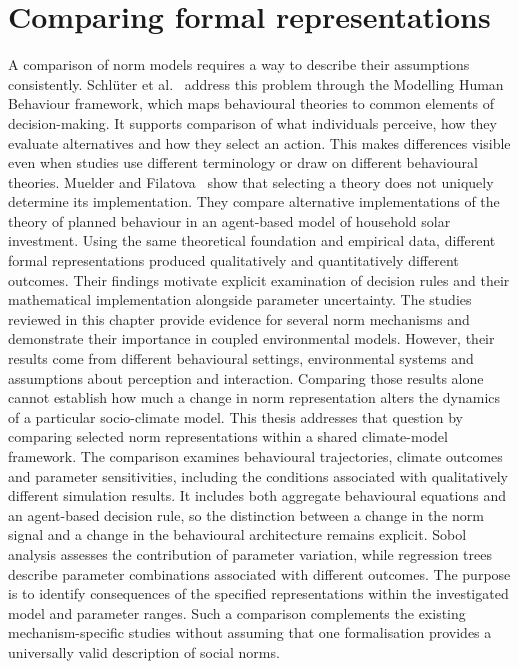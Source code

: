 \section{Comparing formal representations}
\label{sec:related-model-comparison}

A comparison of norm models requires a way to describe their assumptions consistently. Schl\"uter et
al.~\cite{schlueter2017framework} address this problem through the Modelling Human Behaviour framework,
which maps behavioural theories to common elements of decision-making. It supports comparison of what
individuals perceive, how they evaluate alternatives and how they select an action. This makes
differences visible even when studies use different terminology or draw on different behavioural
theories. Muelder and Filatova~\cite{muelder2018formalizations} show that selecting a theory does not
uniquely determine its implementation. They compare alternative implementations of the theory of planned
behaviour in an agent-based model of household solar investment. Using the same theoretical foundation
and empirical data, different formal representations produced qualitatively and quantitatively different
outcomes. Their findings motivate explicit examination of decision rules and their mathematical
implementation alongside parameter uncertainty. The studies reviewed in this chapter provide evidence for
several norm mechanisms and demonstrate their importance in coupled environmental models. However, their
results come from different behavioural settings, environmental systems and assumptions about perception
and interaction. Comparing those results alone cannot establish how much a change in norm representation
alters the dynamics of a particular socio-climate model. This thesis addresses that question by comparing
selected norm representations within a shared climate-model framework. The comparison examines
behavioural trajectories, climate outcomes and parameter sensitivities, including the conditions
associated with qualitatively different simulation results. It includes both aggregate behavioural
equations and an agent-based decision rule, so the distinction between a change in the norm signal and a
change in the behavioural architecture remains explicit. Sobol analysis assesses the contribution of
parameter variation, while regression trees describe parameter combinations associated with different
outcomes. The purpose is to identify consequences of the specified representations within the
investigated model and parameter ranges. Such a comparison complements the existing mechanism-specific
studies without assuming that one formalisation provides a universally valid description of social norms.

